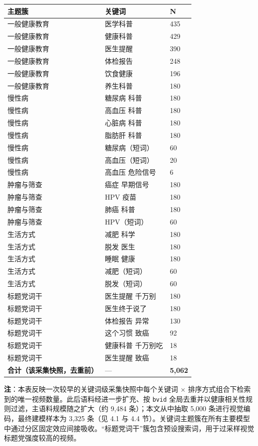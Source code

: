 \documentclass[
  fontset=none]{ctexart}
\begin{document}
\begin{longtable}[]{@{}lll@{}}
\toprule\noalign{}
主题簇 & 关键词 & N \\
\midrule\noalign{}
\endhead
\bottomrule\noalign{}
\endlastfoot
一般健康教育 & 医学科普 & 435 \\
一般健康教育 & 健康科普 & 429 \\
一般健康教育 & 医生提醒 & 390 \\
一般健康教育 & 体检报告 & 248 \\
一般健康教育 & 饮食健康 & 196 \\
一般健康教育 & 养生科普 & 180 \\
慢性病 & 糖尿病 科普 & 180 \\
慢性病 & 高血压 科普 & 180 \\
慢性病 & 心脏病 科普 & 180 \\
慢性病 & 脂肪肝 科普 & 180 \\
慢性病 & 糖尿病（短词） & 60 \\
慢性病 & 高血压（短词） & 20 \\
慢性病 & 高血压 危险信号 & 6 \\
肿瘤与筛查 & 癌症 早期信号 & 180 \\
肿瘤与筛查 & HPV 疫苗 & 180 \\
肿瘤与筛查 & 肺癌 科普 & 180 \\
肿瘤与筛查 & HPV（短词） & 60 \\
生活方式 & 减肥 科学 & 180 \\
生活方式 & 脱发 医生 & 180 \\
生活方式 & 睡眠 健康 & 180 \\
生活方式 & 减肥（短词） & 60 \\
生活方式 & 脱发（短词） & 60 \\
标题党词干 & 医生提醒 千万别 & 180 \\
标题党词干 & 医生终于说了 & 180 \\
标题党词干 & 体检报告 异常 & 130 \\
标题党词干 & 这个习惯 致癌 & 92 \\
标题党词干 & 健康科普 千万别吃 & 18 \\
标题党词干 & 医生提醒 致癌 & 18 \\
\textbf{合计（该采集快照，去重前）} & --- & \textbf{5,062} \\
\end{longtable}

\textbf{注}：本表反映一次较早的关键词级采集快照中每个关键词 × 排序方式组合下检索到的唯一视频数量。此后语料经进一步扩充、按 \texttt{bvid} 全局去重并以健康相关性规则过滤，主语料规模随之扩大（约 9{,}484 条）；本文从中抽取 5{,}000 条进行视觉编码，最终建模样本为 3{,}325 条（见 4.1 与 4.4 节）。关键词主题簇在所有主要模型中通过分区固定效应间接吸收。``标题党词干''簇包含预设搜索词，用于过采样视觉标题党强度较高的视频。
\end{document}
